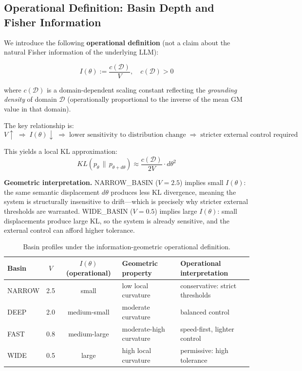 \documentclass[11pt,a4paper]{article}
\begin{document}
\subsection{Operational Definition: Basin Depth and Fisher Information}

We introduce the following \textbf{operational definition}
(not a claim about the natural Fisher information of the underlying LLM):

\begin{equation}
I(\theta) := \frac{c(\mathcal{D})}{V}, \quad c(\mathcal{D}) > 0
\label{eq:fisher_def}
\end{equation}

where $c(\mathcal{D})$ is a domain-dependent scaling constant reflecting the
\textit{grounding density} of domain $\mathcal{D}$
(operationally proportional to the inverse of the mean GM value in that domain).

The key relationship is:
\begin{equation}
V \uparrow \;\Rightarrow\; I(\theta) \downarrow \;\Rightarrow\;
\text{lower sensitivity to distribution change}
\;\Rightarrow\; \text{stricter external control required}
\end{equation}

This yields a local KL approximation:
\begin{equation}
KL(p_\theta \,\|\, p_{\theta+d\theta})
\approx \frac{c(\mathcal{D})}{2V} \cdot d\theta^2
\end{equation}

\textbf{Geometric interpretation.}
NARROW\_BASIN ($V=2.5$) implies small $I(\theta)$:
the same semantic displacement $d\theta$ produces less KL divergence,
meaning the system is structurally insensitive to drift---which is precisely why
stricter external thresholds are warranted.
WIDE\_BASIN ($V=0.5$) implies large $I(\theta)$:
small displacements produce large KL, so the system is already sensitive,
and the external control can afford higher tolerance.

\begin{table}[h]
\centering
\caption{Basin profiles under the information-geometric operational definition.}
\label{tab:basin_geo}
\begin{tabular}{@{}lccll@{}}
\toprule
Basin & $V$ & $I(\theta)$ (operational) & Geometric property & Operational interpretation \\
\midrule
NARROW & 2.5 & small & low local curvature & conservative: strict thresholds \\
DEEP   & 2.0 & medium-small & moderate curvature & balanced control \\
FAST   & 0.8 & medium-large & moderate-high curvature & speed-first, lighter control \\
WIDE   & 0.5 & large & high local curvature & permissive: high tolerance \\
\bottomrule
\end{tabular}
\end{table}
\end{document}
